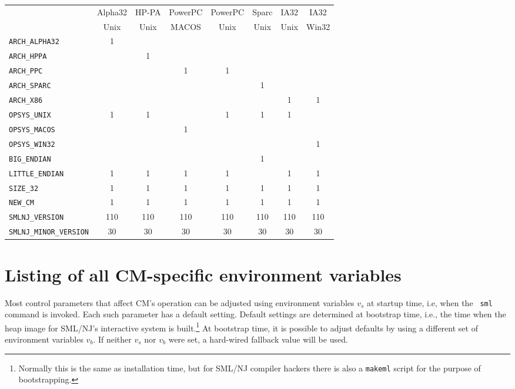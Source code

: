 \documentclass[titlepage,letterpaper]{article}
\newcommand{\smlmj}{110}
\newcommand{\smlmn}{30}
\begin{document}
\begin{center}
\begin{tabular}{l||c|c|c|c|c|c|c}
   & Alpha32 & HP-PA & PowerPC & PowerPC & Sparc & IA32 & IA32 \\
   & Unix & Unix & MACOS & Unix & Unix & Unix & Win32 \\
\hline \hline
{\tt ARCH\_ALPHA32}  & 1 & & & & & & \\
{\tt ARCH\_HPPA}     & & 1 & & & & & \\
{\tt ARCH\_PPC}      & & & 1 & 1 & & & \\
{\tt ARCH\_SPARC}    & & & & & 1 & & \\
{\tt ARCH\_X86}      & & & & & & 1 & 1 \\
{\tt OPSYS\_UNIX}    & 1 & 1 & & 1 & 1 & 1 & \\
{\tt OPSYS\_MACOS}   & & & 1 & & & & \\
{\tt OPSYS\_WIN32}   & & & & & & & 1 \\
{\tt BIG\_ENDIAN}    & & & & & 1 & & \\
{\tt LITTLE\_ENDIAN} & 1 & 1 & 1 & 1 & & 1 & 1 \\
{\tt SIZE\_32}       & 1 & 1 & 1 & 1 & 1 & 1 & 1 \\
{\tt NEW\_CM}        & 1 & 1 & 1 & 1 & 1 & 1 & 1 \\
{\tt SMLNJ\_VERSION} & \smlmj & \smlmj & \smlmj & \smlmj & \smlmj & \smlmj & \smlmj \\
{\tt SMLNJ\_MINOR\_VERSION} & \smlmn & \smlmn & \smlmn & \smlmn & \smlmn & \smlmn & \smlmn
\end{tabular}
\end{center}

\section{Listing of all CM-specific environment variables}

Most control parameters that affect CM's operation can be adjusted
using environment variables $v_s$ at startup time, i.e, when the {\tt
sml} command is invoked.  Each such parameter has a default setting.
Default settings are determined at bootstrap time, i.e., the time when
the heap image for SML/NJ's interactive system is
built.\footnote{Normally this is the same as installation time, but
for SML/NJ compiler hackers there is also a {\tt makeml} script for the
purpose of bootstrapping.}  At bootstrap time, it is possible to
adjust defaults by using a different set of environment variables
$v_b$.  If neither $v_s$ nor $v_b$ were set, a hard-wired fallback
value will be used.
\end{document}
